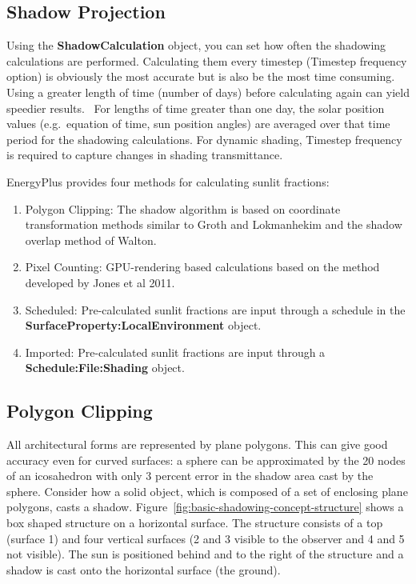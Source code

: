 \subsection{Shadow Projection}\label{shadow-projection}

Using the \textbf{ShadowCalculation} object, you can set how often the shadowing calculations are performed. Calculating them every timestep (Timestep frequency option) is obviously the most accurate but is also be the most time consuming.~ Using a greater length of time (number of days) before calculating again can yield speedier results.~ For lengths of time greater than one day, the solar position values (e.g.~equation of time, sun position angles) are averaged over that time period for the shadowing calculations. For dynamic shading, Timestep frequency is required to capture changes in shading transmittance.

EnergyPlus provides four methods for calculating sunlit fractions:

\begin{enumerate}
    \item Polygon Clipping: The shadow algorithm is based on coordinate transformation methods similar to Groth and Lokmanhekim and the shadow overlap method of Walton.
    \item Pixel Counting: GPU-rendering based calculations based on the method developed by Jones et al 2011.
    \item Scheduled: Pre-calculated sunlit fractions are input through a schedule in the \textbf{SurfaceProperty:LocalEnvironment} object.
    \item Imported: Pre-calculated sunlit fractions are input through a \textbf{Schedule:File:Shading} object.
\end{enumerate}

\subsection{Polygon Clipping}

All architectural forms are represented by plane polygons. This can give good accuracy even for curved surfaces: a sphere can be approximated by the 20 nodes of an icosahedron with only 3 percent error in the shadow area cast by the sphere. Consider how a solid object, which is composed of a set of enclosing plane polygons, casts a shadow. Figure~\ref{fig:basic-shadowing-concept-structure} shows a box shaped structure on a horizontal surface. The structure consists of a top (surface 1) and four vertical surfaces (2 and 3 visible to the observer and 4 and 5 not visible). The sun is positioned behind and to the right of the structure and a shadow is cast onto the horizontal surface (the ground).

